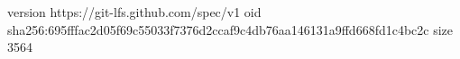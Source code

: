 version https://git-lfs.github.com/spec/v1
oid sha256:695fffac2d05f69c55033f7376d2ccaf9c4db76aa146131a9ffd668fd1c4bc2c
size 3564
